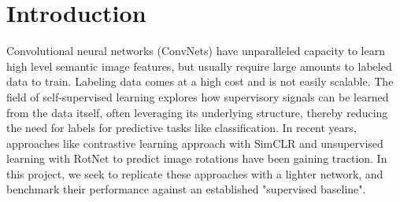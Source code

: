 \section{Introduction}
\label{intro}

Convolutional neural networks (ConvNets) have unparalleled capacity to learn high level semantic image features, but usually require large amounts to labeled data to train. Labeling data comes at a high cost and is not easily scalable. The field of self-supervised learning explores how supervisory signals can be learned from the data itself, often leveraging its underlying structure, thereby reducing the need for labels for predictive tasks like classification. In recent years, approaches like contrastive learning approach with SimCLR \cite{SimCLR} and unsupervised learning with RotNet to predict image rotations \cite{RotNet} have been gaining traction. In this project, we seek to replicate these approaches with a lighter network, and benchmark their performance against an established "supervised baseline".

